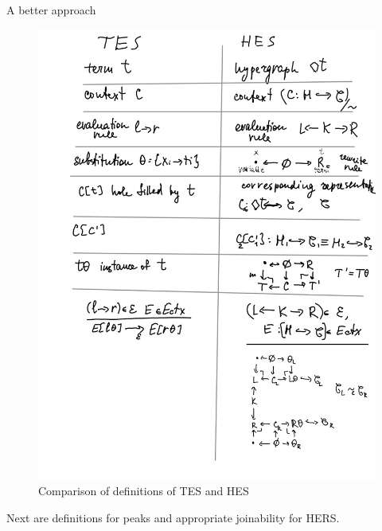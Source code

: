 \documentclass{article}
\theoremstyle{plain}
\theoremstyle{definition}
\begin{document}
\begin{section}{A better approach}
\begin{figure}[H]
\hspace{-1.0cm}
\includegraphics[scale=0.8]{images/teshes.png}
\caption{Comparison of definitions of TES and HES}
\end{figure}

Next are definitions for peaks and appropriate joinability for HERS.


\end{section}
\end{document}
